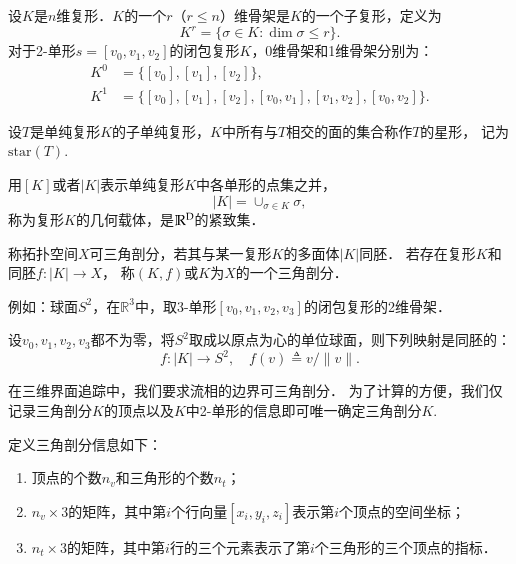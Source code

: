 \begin{defn}
	设$K$是$n$维复形．$K$的一个$r$（$r \leq n$）维骨架是$K$的一个子复形，定义为
	\begin{equation*}
	K^r=\{\sigma \in K:\dim \sigma\leq r\}.
	\end{equation*}
	对于2-单形$s=[v_0,v_1,v_2]$的闭包复形$K$，0维骨架和1维骨架分别为：
	\begin{align*}
	K^0 &=\{[v_0],[v_1],[v_2]\},\\
	K^1 &=\{[v_0],[v_1],[v_2],[v_0,v_1],[v_1,v_2],[v_0,v_2]\}.
	\end{align*}
\end{defn}

\begin{defn}
	设$T$是单纯复形$K$的子单纯复形，$K$中所有与$T$相交的面的集合称作$T$的星形，
	记为$\mathrm{star}(T)$.
\end{defn}

\begin{defn}
	\label{defn:jihezaiti}
	用$[K]$或者$|K|$表示单纯复形$K$中各单形的点集之并，
	\begin{equation*}
	|K|=\cup_{\sigma\in K}\sigma,
	\end{equation*}
	称为复形$K$的几何载体，是$\mathbb{R}^{\textup{D}}$的紧致集．
\end{defn}

\begin{defn}
	称拓扑空间$X$可三角剖分，若其与某一复形$K$的多面体$|K|$同胚．
	若存在复形$K$和同胚$f: |K|\rightarrow X$，
	称$(K,f)$或$K$为$X$的一个三角剖分．	
\end{defn}

例如：球面$S^2$，在$\mathbb{R}^3$中，取3-单形$[v_0,v_1,v_2,v_3]$的闭包复形的2维骨架．

设$v_0,v_1,v_2,v_3$都不为零，将$S^2$取成以原点为心的单位球面，则下列映射是同胚的：
\begin{equation*}
f:|K|\rightarrow S^2,\quad f(v)\triangleq v/\|v\|.
\end{equation*}

在三维界面追踪中，我们要求流相的边界可三角剖分．
为了计算的方便，我们仅记录三角剖分$K$的顶点以及$K$中2-单形的信息即可唯一确定三角剖分$K$.
\begin{defn}
	\label{defn:triangulation}
	定义三角剖分信息如下：
	\begin{enumerate}
		\setlength{\itemsep}{0pt}
		\setlength{\parsep}{0pt}
		\setlength{\parskip}{0pt}
		\item 顶点的个数$n_v$和三角形的个数$n_t$；
		\item $n_v\times 3$的矩阵，其中第$i$个行向量$[x_i,y_i,z_i]$表示第$i$个顶点的空间坐标；
		\item $n_t\times 3$的矩阵，其中第$i$行的三个元素表示了第$i$个三角形的三个顶点的指标．
	\end{enumerate}
\end{defn}







